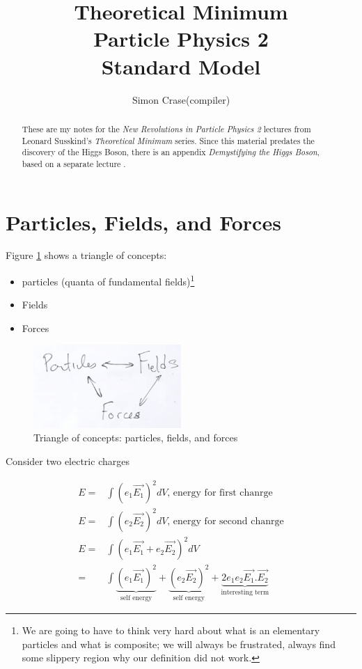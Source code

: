 \documentclass[]{article}
\title{Theoretical Minimum\\Particle Physics 2\\Standard Model}
\author{Simon Crase(compiler)}
\begin{document}
\maketitle

\begin{abstract}
	These are my notes for the \emph{New Revolutions in Particle Physics 2} lectures from Leonard Susskind's \emph{Theoretical Minimum} series\cite{susskind2010standard}. Since this material predates the discovery of the Higgs Boson, there is an appendix \emph{Demystifying the Higgs Boson}, based on a separate lecture \cite{susskind2010demystifing}.
\end{abstract}

\tableofcontents
\listoffigures
\listoftables
\listoftheorems

\section{Particles, Fields, and Forces}

Figure \ref{fig:particles:fields:forces} shows a triangle of concepts:
\begin{itemize}
	\item particles (quanta of fundamental fields)\footnote{We are going to have to think very hard about what is an elementary particles and what is composite; we will always be frustrated, always find some slippery region why our definition did not work.}
	\item Fields
	\item Forces
\end{itemize}

\begin{figure}[H]
	\begin{center}
		\caption{Triangle of concepts: particles, fields, and forces}\label{fig:particles:fields:forces}
		\includegraphics[width=0.5\textwidth]{ParticlesFieldsForces}
	\end{center}
\end{figure}

Consider two electric charges

\begin{align*}
E=&\int (e_1 \vec{E_1})^2 dV \text{, energy for first chanrge}\\
E=&\int (e_2 \vec{E_2})^2 dV \text{, energy for second chanrge}\\
E=&\int (e_1\vec{E_1}+e_2 \vec{E_2})^2 dV\\
=&\int \underbrace{(e_1\vec{E_1})^2}_\text{self energy}+ \underbrace{(e_2\vec{E_2})^2}_\text{self energy} + \underbrace{2e_1e_2\vec{E_1}.\vec{E_2}}_\text{interesting term}
\end{align*}
\end{document}
